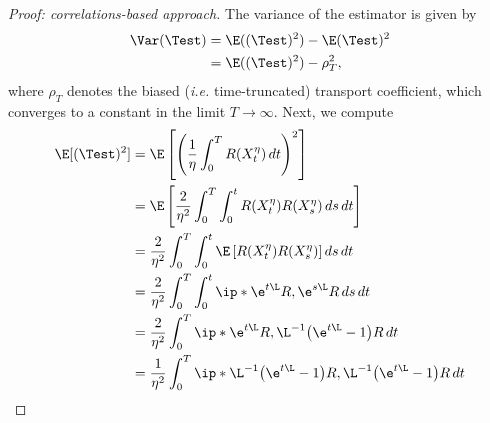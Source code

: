 \begin{proof}[Proof: correlations-based approach]
	The variance of the estimator is given by 
	\begin{align}
		\Var(\Test) &= \E((\Test)^2) - \E(\Test)^2 \\
			&= \E((\Test)^2) - \rho_T^2,
	\end{align}
	where $\rho_T$ denotes the biased (\emph{i.e.} time-truncated) transport coefficient, which converges to a constant in the limit $T\to\infty$. Next, we compute 
	\begin{align}
		\E[(\Test)^2] &= \E\left[\left(\frac{1}{\eta}\int_0^T R(X_t^\eta) \, dt\right)^2\right] \\
		&= \E\left[\frac{2}{\eta^2}\int_0^T\int_0^t R(X_t^\eta)R(X_s^\eta) \, ds \, dt\right] \\
		&= \frac{2}{\eta^2}\int_0^T\int_0^t \E\left[R(X_t^\eta)R(X_s^\eta)\right] ds \, dt \\
		&= \frac{2}{\eta^2}\int_0^T\int_0^t \ip*{\e^{t\L}R, \e^{s\L}R} \, ds \, dt \\
		&= \frac{2}{\eta^2}\int_0^T \ip*{\e^{t\L}R, \L^{-1}\bigl(\e^{t\L} - 1\bigr)R} \, dt \\
		&= \frac{1}{\eta^2}\int_0^T \ip*{\L^{-1}\bigl(\e^{t\L} - 1\bigr)R, \L^{-1}\bigl(\e^{t\L} - 1\bigr)R} \, dt
	\end{align}
\end{proof}

